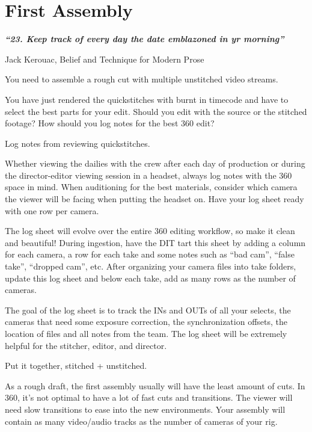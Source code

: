 \chapter{First Assembly}
\pagecolor{white}
\label{chap:31}
\begin{fullwidth}

{\itshape\bfseries “23. Keep track of every day the date emblazoned in yr morning”}

Jack Kerouac, Belief and Technique for Modern Prose
\vspace{\baselineskip}

\problem

{\large You need to assemble a rough cut with multiple unstitched video streams. \par}

You have just rendered the quickstitches with burnt in timecode and have to select the best parts for your edit. Should you edit with the source or the stitched footage? How should you log notes for the best 360 edit?  

\solution

{\large Log notes from reviewing quickstitches. \par}

Whether viewing the dailies with the crew after each day of production or during the director-editor viewing session in a headset, always log notes with the 360 space in mind. When auditioning for the best materials, consider which camera the viewer will be facing when putting the  headset on. Have your log sheet ready with one row per camera. 

The log sheet will evolve over the entire 360 editing workflow, so make it clean and beautiful! During ingestion, have the DIT tart this sheet by adding a column for each camera, a row for each take and some notes such as “bad cam”, “false take”, “dropped cam”, etc. After organizing your camera files into take folders, update this log sheet and below each take, add as many rows as the number of cameras.

The goal of the log sheet is to track the INs and OUTs of all your selects, the cameras that need some exposure correction, the synchronization offsets, the location of files and all notes from the team. The log sheet will be extremely helpful for the stitcher, editor, and director.

{\large Put it together, stitched + unstitched. \par}

As a rough draft, the first assembly usually will have the least amount of cuts. In 360, it’s not optimal to have a lot of fast cuts and transitions. The viewer will need slow transitions to ease into the new environments. Your assembly will contain as many video/audio tracks as the number of cameras of your rig. 


\end{fullwidth}
